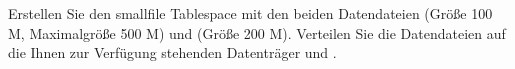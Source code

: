     \item Erstellen Sie den smallfile Tablespace  mit den beiden Datendateien  (Größe 100 M, Maximalgröße 500 M) und  (Größe 200 M). Verteilen Sie die Datendateien auf die Ihnen zur Verfügung stehenden Datenträger  und .
